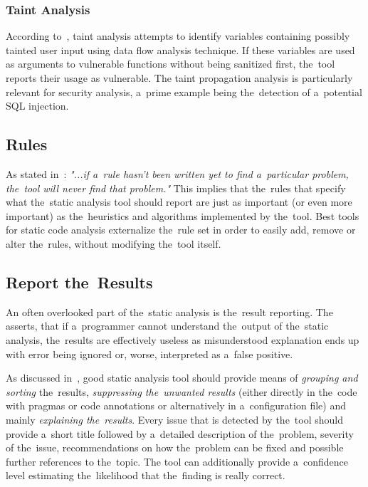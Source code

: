 \documentclass[
  digital, %
  table,   %
  lof,     %
  lot,     %
  oneside,
]{fithesis3}
\begin{document}
\subsubsection{Taint Analysis}
According to~\cite{oswap-sca}, taint analysis attempts to identify variables containing possibly tainted user input using data flow analysis technique. If these variables are used as arguments to vulnerable functions without being sanitized first, the~tool reports their usage as vulnerable. The taint propagation analysis is particularly relevant for security analysis, a~prime example being the~detection of a~potential SQL injection.

\subsection{Rules}
As stated in~\cite{sca-for-security}: \textit{"...if a~rule hasn’t been written yet to find a~particular problem, the~tool will never find that problem."} This implies that the~rules that specify what the~static analysis tool should report are just as important (or even more important) as the~heuristics and algorithms implemented by the~tool. Best tools for static code analysis externalize the~rule set in order to easily add, remove or alter the~rules, without modifying the~tool itself.

\subsection{Report the~Results}
An often overlooked part of the~static analysis is the~result reporting. The~\cite{coverity-sca} asserts, that if a~programmer cannot understand the~output of the~static analysis, the~results are effectively useless as misunderstood explanation ends up with error being ignored or, worse, interpreted as a~false positive.

As discussed in~\cite{security-programming-sca}, good static analysis tool should provide means of \textit{grouping and sorting} the~results, \textit{suppressing the~unwanted results} (either directly in the~code with pragmas or code annotations or alternatively in a~configuration file) and mainly \textit{explaining the~results}. Every issue that is detected by the~tool should provide a~short title followed by a~detailed description of the~problem, severity of the~issue, recommendations on how the~problem can be fixed and possible further references to the~topic. The tool can additionally provide a~confidence level estimating the~likelihood that the~finding is really correct.
\end{document}
